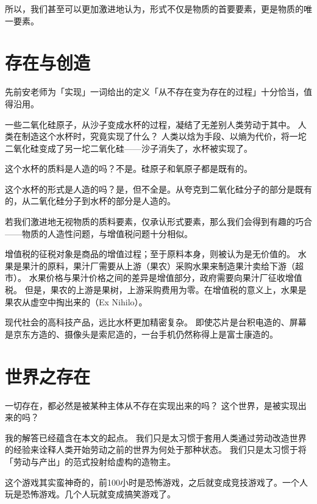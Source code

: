 所以，我们甚至可以更加激进地认为，形式不仅是物质的首要要素，更是物质的唯一要素。

\section{存在与创造}

先前安老师为「实现」一词给出的定义「从不存在变为存在的过程」十分恰当，值得沿用。

一些二氧化硅原子，从沙子变成水杯的过程，凝结了无差别人类劳动于其中。
人类在制造这个水杯时，究竟实现了什么？
人类以焓为手段、以熵为代价，将一坨二氧化硅变成了另一坨二氧化硅——沙子消失了，水杯被实现了。

这个水杯的质料是人造的吗？不是。硅原子和氧原子都是既有的。

这个水杯的形式是人造的吗？是，但不全是。从夸克到二氧化硅分子的部分是既有的，从二氧化硅分子到水杯的部分是人造的。

若我们激进地无视物质的质料要素，仅承认形式要素，那么我们会得到有趣的巧合——物质的人造性问题，与增值税问题十分相似。

增值税的征税对象是商品的增值过程；至于原料本身，则被认为是无价值的。
水果是果汁的原料，果汁厂需要从上游（果农）采购水果来制造果汁卖给下游（超市）。
水果价格与果汁价格之间的差异是增值部分，政府需要向果汁厂征收增值税。
但是，果农的上游是果树，上游采购费用为零。在增值税的意义上，水果是果农从虚空中掏出来的（Ex Nihilo）。

现代社会的高科技产品，远比水杯更加精密复杂。
即使芯片是台积电造的、屏幕是京东方造的、摄像头是索尼造的，一台手机仍然称得上是富士康造的。

\section{世界之存在}

一切存在，都必然是被某种主体从不存在实现出来的吗？
这个世界，是被实现出来的吗？

我的解答已经蕴含在本文的起点。
我们只是太习惯于套用人类通过劳动改造世界的经验来诠释人类开始劳动之前的世界为何处于那种状态。
我们只是太习惯于将「劳动与产出」的范式投射给虚构的造物主。










这个游戏其实蛮神奇的，前100小时是恐怖游戏，之后就变成竞技游戏了。一个人玩是恐怖游戏。几个人玩就变成搞笑游戏了。

